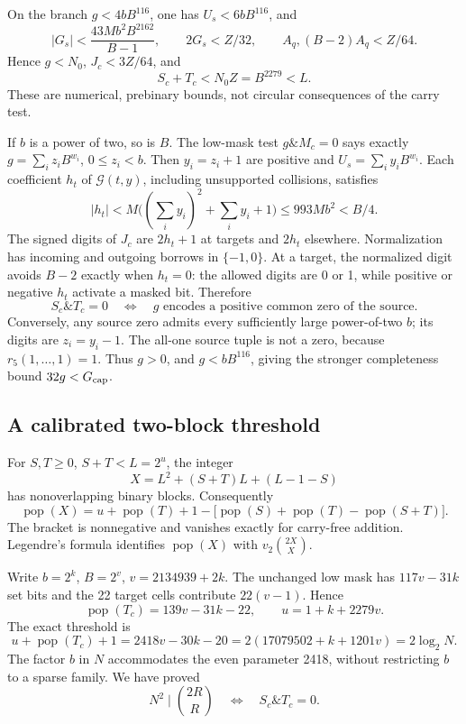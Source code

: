 On the branch \(g<4bB^{116}\), one has \(U_s<6bB^{116}\), and
\[
 |G_s|<\frac{43Mb^2 B^{2162}}{B-1},\qquad
 2G_s<Z/32,\qquad A_q,(B-2)A_q<Z/64.
\]
Hence \(g<N_0\), \(J_c<3Z/64\), and
\[
 S_c+T_c<N_0Z=B^{2279}<L.
\]
These are numerical, prebinary bounds, not circular consequences of the carry
test.

If \(b\) is a power of two, so is \(B\).  The low-mask test
\(g\mathbin{\&}M_c=0\) says exactly
\(g=\sum_i z_iB^{w_i}\), \(0\le z_i<b\).  Then \(y_i=z_i+1\) are
positive and \(U_s=\sum_i y_iB^{w_i}\).  Each coefficient \(h_t\) of
\(\mathcal G(t,y)\), including unsupported collisions, satisfies
\[
 |h_t|<M\bigl((\textstyle\sum_i y_i)^2+\sum_i y_i+1\bigr)
 \le993Mb^2<B/4.
\]
The signed digits of \(J_c\) are \(2h_t+1\) at targets and \(2h_t\)
elsewhere.  Normalization has incoming and outgoing borrows in \(\{-1,0\}\).
At a target, the normalized digit avoids \(B-2\) exactly when \(h_t=0\):
the allowed digits are 0 or 1, while positive or negative \(h_t\) activate a
masked bit.  Therefore
\[
 S_c\mathbin{\&}T_c=0
 \quad\Longleftrightarrow\quad
 g\text{ encodes a positive common zero of the source.}
\]
Conversely, any source zero admits every sufficiently large power-of-two
\(b\); its digits are \(z_i=y_i-1\).  The all-one source tuple is not a
zero, because \(r_5(1,\ldots,1)=1\).  Thus \(g>0\), and
\(g<bB^{116}\), giving the stronger completeness bound
\(32g<G_{\rm cap}\).

\subsection{A calibrated two-block threshold}
For \(S,T\ge0\), \(S+T<L=2^u\), the integer
\[
 X=L^2+(S+T)L+(L-1-S)
\]
has nonoverlapping binary blocks.  Consequently
\[
 \operatorname{pop}(X)=u+\operatorname{pop}(T)+1
 -\bigl[\operatorname{pop}(S)+\operatorname{pop}(T)
 -\operatorname{pop}(S+T)\bigr].
\]
The bracket is nonnegative and vanishes exactly for carry-free addition.
Legendre's formula identifies \(\operatorname{pop}(X)\) with
\(v_2\binom{2X}{X}\).

Write \(b=2^k\), \(B=2^v\), \(v=2134939+2k\).  The unchanged low
mask has \(117v-31k\) set bits and the 22 target cells contribute
\(22(v-1)\).  Hence
\[
 \operatorname{pop}(T_c)=139v-31k-22,\qquad
 u=1+k+2279v.
\]
The exact threshold is
\[
 u+\operatorname{pop}(T_c)+1=2418v-30k-20
 =2(17079502+k+1201v)=2\log_2N.
\]
The factor \(b\) in \(N\) accommodates the even parameter 2418, without
restricting \(b\) to a sparse family.  We have proved
\[
 N^2\mid\binom{2R}{R}\quad\Longleftrightarrow\quad
 S_c\mathbin{\&}T_c=0.
\]

